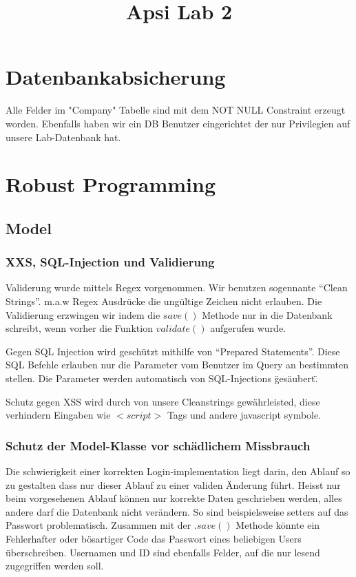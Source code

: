 \documentclass[10pt]{scrartcl}
\title{ %
Apsi
\vspace{0.2cm}
\Large Lab 2 }
\begin{document}
 \maketitle
 \thispagestyle{firststyle}
 \pagestyle{firststyle}
 \begin{abstract}
 \begin{center}

 \end{center}
 \vspace{0.5cm}
\hrulefill
\end{abstract}

 \pagestyle{documentstyle}
 \tableofcontents
 \pagebreak
\section{Datenbankabsicherung}
Alle Felder im "Company" Tabelle sind mit dem NOT NULL Constraint erzeugt worden. Ebenfalls haben wir ein DB Benutzer eingerichtet der nur Privilegien auf unsere Lab-Datenbank hat.
 
\section{Robust Programming}

\subsection{Model}
\subsubsection{XXS, SQL-Injection und Validierung}
Validerung wurde mittels Regex vorgenommen. Wir benutzen sogennante ``Clean Strings''. m.a.w Regex Ausdrücke die ungültige Zeichen nicht erlauben. Die Validierung erzwingen wir indem die $save()$ Methode nur in die Datenbank schreibt, wenn vorher die Funktion $validate()$ aufgerufen wurde.

Gegen SQL Injection wird geschützt mithilfe von ``Prepared Statements''. Diese SQL Befehle erlauben nur die Parameter 
vom Benutzer im Query an bestimmten stellen. Die Parameter werden automatisch von SQL-Injections \"gesäubert\".
 
Schutz gegen XSS wird durch von unsere Cleanstrings gewährleisted, diese verhindern Eingaben wie $<script>$ Tags und andere javascript symbole.

\subsubsection{Schutz der Model-Klasse vor schädlichem Missbrauch}
Die schwierigkeit einer korrekten Login-implementation liegt darin, den Ablauf so zu gestalten dass nur dieser Ablauf zu einer validen Änderung führt. Heisst nur beim vorgesehenen Ablauf können nur korrekte Daten geschrieben werden, alles andere darf die Datenbank nicht verändern. So sind beispielsweise setters auf das Passwort problematisch. Zusammen mit der $.save()$ Methode könnte ein Fehlerhafter oder bösartiger Code das Passwort eines beliebigen Users überschreiben. Usernamen und ID sind ebenfalls Felder, auf die nur lesend zugegriffen werden soll.
\end{document}

